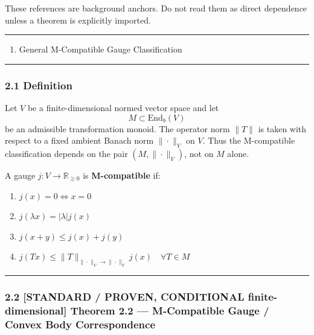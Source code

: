 \documentclass[
  11pt,
]{article}
\providecommand{\tightlist}{%
  \setlength{\itemsep}{0pt}\setlength{\parskip}{0pt}}
\providecommand{\tightlist}{%
  \setlength{\itemsep}{0pt}\setlength{\parskip}{0pt}}
\begin{document}
These references are background anchors. Do not read them as direct dependence unless a theorem is explicitly imported.

\begin{center}\rule{0.5\linewidth}{0.5pt}\end{center}

\begin{enumerate}
\def\labelenumi{\arabic{enumi}.}
\setcounter{enumi}{1}
\tightlist
\item
  General M-Compatible Gauge Classification
\end{enumerate}

\begin{center}\rule{0.5\linewidth}{0.5pt}\end{center}

\subsubsection{2.1 Definition}\label{definition}

Let \(V\) be a finite-dimensional normed vector space and let
\[M \subset \mathrm{End}_b(V)\]
be an admissible transformation monoid. The operator norm \(\|T\|\) is taken with respect to a fixed ambient Banach norm \(\|\cdot\|_V\) on \(V\). Thus the M-compatible classification depends on the pair \((M, \|\cdot\|_V)\), not on \(M\) alone.

A gauge \(j: V \to \mathbb{R}_{\geq 0}\) is \textbf{M-compatible} if:

\begin{enumerate}
\def\labelenumi{\arabic{enumi}.}
\tightlist
\item
  \(j(x) = 0 \iff x = 0\)
\item
  \(j(\lambda x) = |\lambda| j(x)\)
\item
  \(j(x + y) \leq j(x) + j(y)\)
\item
  \(j(T x) \leq \|T\|_{\|\cdot\|_V\to\|\cdot\|_V} j(x) \quad \forall T \in M\)
\end{enumerate}

\begin{center}\rule{0.5\linewidth}{0.5pt}\end{center}

\subsubsection{\texorpdfstring{2.2 \textbf{{[}STANDARD / PROVEN, CONDITIONAL finite-dimensional{]} Theorem 2.2 --- M-Compatible Gauge / Convex Body Correspondence}}{2.2 {[}STANDARD / PROVEN, CONDITIONAL finite-dimensional{]} Theorem 2.2 --- M-Compatible Gauge / Convex Body Correspondence}}\label{standard-proven-conditional-finite-dimensional-theorem-2.2-m-compatible-gauge-convex-body-correspondence}
\end{document}
